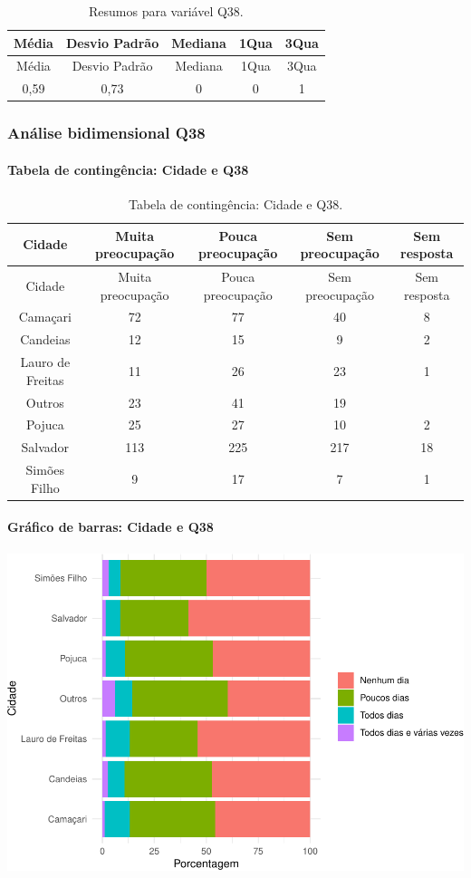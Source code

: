 \documentclass[]{article}
\let\oldparagraph\paragraph
\renewcommand{\paragraph}[1]{\oldparagraph{#1}\mbox{}}
\begin{document}
\begin{longtable}[]{@{}ccccc@{}}
\caption{\label{tab:unnamed-chunk-1428}Resumos para variável Q38.}\tabularnewline
\toprule
Média & Desvio Padrão & Mediana & 1Qua & 3Qua\tabularnewline
\midrule
\endfirsthead
\toprule
Média & Desvio Padrão & Mediana & 1Qua & 3Qua\tabularnewline
\midrule
\endhead
0,59 & 0,73 & 0 & 0 & 1\tabularnewline
\bottomrule
\end{longtable}

\cleardoublepage

\hypertarget{anuxe1lise-bidimensional-q38}{%
\subsubsection{Análise bidimensional Q38}\label{anuxe1lise-bidimensional-q38}}

\hypertarget{tabela-de-continguxeancia-cidade-e-q38}{%
\paragraph{Tabela de contingência: Cidade e Q38}\label{tabela-de-continguxeancia-cidade-e-q38}}

\begin{longtable}[]{@{}ccccc@{}}
\caption{\label{tab:unnamed-chunk-1429}Tabela de contingência: Cidade e Q38.}\tabularnewline
\toprule
Cidade & Muita preocupação & Pouca preocupação & Sem preocupação & Sem resposta\tabularnewline
\midrule
\endfirsthead
\toprule
Cidade & Muita preocupação & Pouca preocupação & Sem preocupação & Sem resposta\tabularnewline
\midrule
\endhead
Camaçari & 72 & 77 & 40 & 8\tabularnewline
Candeias & 12 & 15 & 9 & 2\tabularnewline
Lauro de Freitas & 11 & 26 & 23 & 1\tabularnewline
Outros & 23 & 41 & 19 &\tabularnewline
Pojuca & 25 & 27 & 10 & 2\tabularnewline
Salvador & 113 & 225 & 217 & 18\tabularnewline
Simões Filho & 9 & 17 & 7 & 1\tabularnewline
\bottomrule
\end{longtable}

\hypertarget{gruxe1fico-de-barras-cidade-e-q38}{%
\paragraph{Gráfico de barras: Cidade e Q38}\label{gruxe1fico-de-barras-cidade-e-q38}}

\begin{center}\includegraphics[width=0.75\linewidth]{relatorio_covid19_files/figure-latex/unnamed-chunk-1430-1} \end{center}
\end{document}
